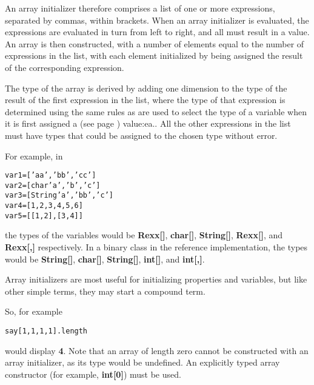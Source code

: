 An array initializer therefore comprises a list of one or more
expressions, separated by commas, within brackets.  When an array
initializer is evaluated, the expressions are evaluated in turn from
left to right, and all must result in a value.
An array is then constructed, with a number of elements
equal to the number of expressions in the list, with each element
initialized by being assigned the result of the corresponding
expression.
 
The type of the array is derived by adding one dimension to the type of
the result of the first expression in the list, where the type of that
expression is determined using the same rules as are used to select the
type of a variable when it is first  assigned a (see page \pageref{refassign}) 
value:ea..
All the other expressions in the list must have types that could be
assigned to the chosen type without error.
 
For example, in
\begin{alltt}
var1=['aa', 'bb', 'cc']
var2=[char 'a', 'b', 'c']
var3=[String 'a', 'bb', 'c']
var4=[1, 2, 3, 4, 5, 6]
var5=[[1,2], [3,4]]
\end{alltt}
the types of the variables would
be \textbf{Rexx[]}, \textbf{char[]}, \textbf{String[]}, \textbf{Rexx[]},
and \textbf{Rexx[,]} respectively.
In a binary class in the reference implementation, the types would
be \textbf{String[]}, \textbf{char[]}, \textbf{String[]}, \textbf{int[]},
and \textbf{int[,]}.
 
Array initializers are most useful for initializing properties and
variables, but like other simple terms, they may start a compound term.
 
So, for example
\begin{alltt}
say [1,1,1,1].length
\end{alltt}
would display \textbf{4}.
 Note that an array of length zero cannot be constructed with an array
initializer, as its type would be undefined.  An explicitly typed array
constructor (for example, \textbf{int[0]}) must be used.
